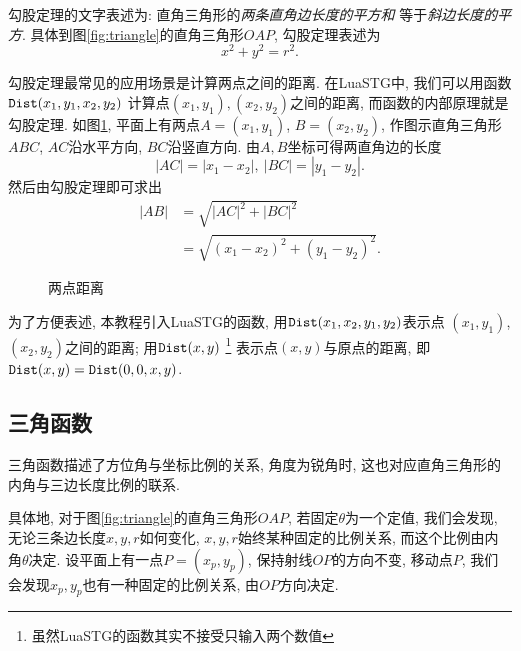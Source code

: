 勾股定理的文字表述为:
直角三角形的\emph{两条直角边长度的平方和}
等于\emph{斜边长度的平方}.
具体到图\ref{fig:triangle}的直角三角形$OAP$,
勾股定理表述为 \[ x^2 + y^2 = r^2. \]

勾股定理最常见的应用场景是计算两点之间的距离.
在LuaSTG中, 我们可以用函数
$\texttt{Dist}(x_1,y_1,x_2,y_2)$
计算点$(x_1,y_1),(x_2,y_2)$之间的距离,
而\Dist 函数的内部原理就是勾股定理.
如图\ref{fig:dist-func},
平面上有两点$A=(x_1,y_1)$, $B=(x_2,y_2)$,
作图示直角三角形$ABC$, $AC$沿水平方向, $BC$沿竖直方向.
由$A,B$坐标可得两直角边的长度
\[
  |AC| = |x_1 - x_2|,\
  |BC| = |y_1 - y_2|.
\]
然后由勾股定理即可求出
\begin{align*}
  |AB| & = \sqrt{|AC|^2 + |BC|^2}                \\
       & = \sqrt{(x_1 - x_2)^2 + (y_1 - y_2)^2}.
\end{align*}

\begin{figure}[htbp]
  \centering
  \caption{两点距离}
  \label{fig:dist-func}
\end{figure}

为了方便表述, 本教程引入LuaSTG的\Dist 函数,
用$\texttt{Dist}(x_1,x_2,y_1,y_2)$表示点
$(x_1,y_1)$, $(x_2,y_2)$之间的距离;
用$\texttt{Dist}(x,y)$
\footnote{虽然LuaSTG的\Dist 函数其实不接受只输入两个数值}
表示点$(x,y)$与原点的距离,
即$\texttt{Dist}(x,y) = \texttt{Dist}(0,0,x,y)$.

\subsection{三角函数}

三角函数描述了方位角与坐标比例的关系,
角度为锐角时, 这也对应直角三角形的内角与三边长度比例的联系.

具体地, 对于图\ref{fig:triangle}的直角三角形$OAP$,
若固定$\theta$为一个定值, 我们会发现,
无论三条边长度$x,y,r$如何变化,
$x,y,r$始终某种固定的比例关系,
而这个比例由内角$\theta$决定.
设平面上有一点$P=(x_p,y_p)$,
保持射线$OP$的方向不变, 移动点$P$,
我们会发现$x_p,y_p$也有一种固定的比例关系,
由$OP$方向决定.

